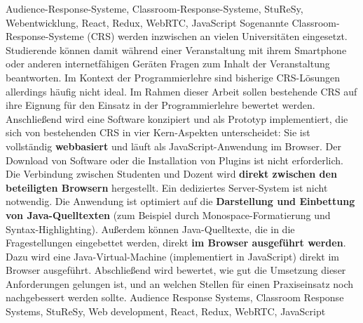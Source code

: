 \documentclass[draft=false
              ,paper=a4
              ,twoside=false
              ,fontsize=11pt
              ,headsepline
              ,BCOR=10mm
              ]{scrbook}
\begin{document}
\HAWAbstractPage
{Audience-Response-Systeme, Classroom-Response-Systeme, StuReSy, Webentwicklung, React, Redux, WebRTC, JavaScript}
{Sogenannte Classroom-Response-Systeme (CRS) werden inzwischen an vielen Universitäten eingesetzt. Studierende können damit während einer Veranstaltung mit ihrem Smartphone oder anderen internetfähigen Geräten Fragen zum Inhalt der Veranstaltung beantworten. Im Kontext der Programmierlehre sind bisherige CRS-Lösungen allerdings häufig nicht ideal. Im Rahmen dieser Arbeit sollen bestehende CRS auf ihre Eignung für den Einsatz in der Programmierlehre bewertet werden. Anschließend wird eine Software konzipiert und als Prototyp implementiert, die sich von bestehenden CRS in vier Kern-Aspekten unterscheidet:\newline
Sie ist vollständig \textbf{webbasiert} und läuft als JavaScript-Anwendung im Browser. Der Download von Software oder die Installation von Plugins ist nicht erforderlich.\newline
Die Verbindung zwischen Studenten und Dozent wird \textbf{direkt zwischen den beteiligten Browsern} hergestellt. Ein dediziertes Server-System ist nicht notwendig.\newline
Die Anwendung ist optimiert auf die \textbf{Darstellung und Einbettung von Java-Quelltexten} (zum Beispiel durch Monospace-Formatierung und Syntax-Highlighting).\newline
Außerdem können Java-Quelltexte, die in die Fragestellungen eingebettet werden, direkt \textbf{im Browser ausgeführt werden}. Dazu wird eine Java-Virtual-Machine (implementiert in JavaScript) direkt im Browser ausgeführt.\newline
Abschließend wird bewertet, wie gut die Umsetzung dieser Anforderungen gelungen ist, und an welchen Stellen für einen Praxiseinsatz noch nachgebessert werden sollte.}
{Audience Response Systems, Classroom Response Systems, StuReSy, Web development, React, Redux, WebRTC, JavaScript}
\end{document}
